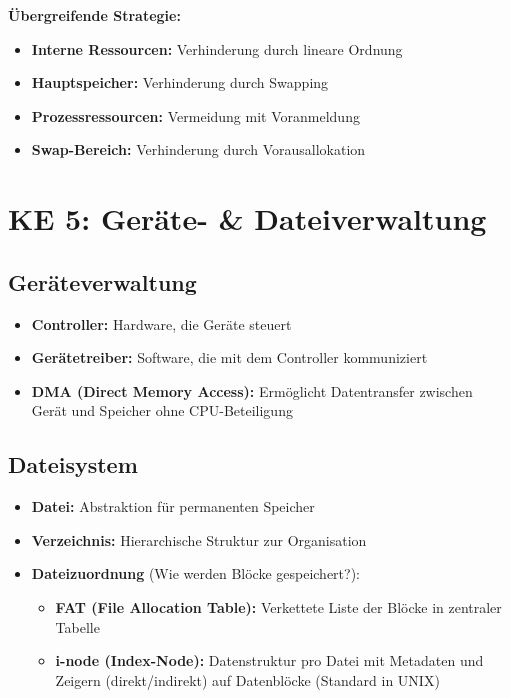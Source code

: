 \documentclass[9pt,a4paper]{extarticle}
\begin{document}
\begin{multicols*}{2}
\textbf{Übergreifende Strategie:}
\begin{itemize}
\item \textbf{Interne Ressourcen:} Verhinderung durch lineare Ordnung
\item \textbf{Hauptspeicher:} Verhinderung durch Swapping
\item \textbf{Prozessressourcen:} Vermeidung mit Voranmeldung
\item \textbf{Swap-Bereich:} Verhinderung durch Vorausallokation
\end{itemize}

\section{KE 5: Geräte- \& Dateiverwaltung}

\subsection{Geräteverwaltung}
\begin{itemize}
\item \textbf{Controller:} Hardware, die Geräte steuert
\item \textbf{Gerätetreiber:} Software, die mit dem Controller kommuniziert
\item \textbf{DMA (Direct Memory Access):} Ermöglicht Datentransfer zwischen Gerät und Speicher ohne CPU-Beteiligung
\end{itemize}

\subsection{Dateisystem}
\begin{itemize}
\item \textbf{Datei:} Abstraktion für permanenten Speicher
\item \textbf{Verzeichnis:} Hierarchische Struktur zur Organisation
\item \textbf{Dateizuordnung} (Wie werden Blöcke gespeichert?):
  \begin{itemize}
  \item \textbf{FAT (File Allocation Table):} Verkettete Liste der Blöcke in zentraler Tabelle
  \item \textbf{i-node (Index-Node):} Datenstruktur pro Datei mit Metadaten und Zeigern (direkt/indirekt) auf Datenblöcke (Standard in UNIX)
  \end{itemize}
\end{itemize}


\end{multicols*}
\end{document}
